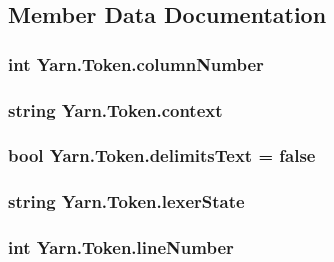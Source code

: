 \subsection{Member Data Documentation}
\hypertarget{a00149_a9a0f0a8a7ab1e90ab48f15192323ffca}{
\subsubsection[{column\-Number}]{\setlength{\rightskip}{0pt plus 5cm}int Yarn.\-Token.\-column\-Number}}\label{a00149_a9a0f0a8a7ab1e90ab48f15192323ffca}
\hypertarget{a00149_a089d248c904a6e8366b81c2c47ff5af8}{
\subsubsection[{context}]{\setlength{\rightskip}{0pt plus 5cm}string Yarn.\-Token.\-context}}\label{a00149_a089d248c904a6e8366b81c2c47ff5af8}
\hypertarget{a00149_af15d26fa4e6f276ab58ff66d3c4203da}{
\subsubsection[{delimits\-Text}]{\setlength{\rightskip}{0pt plus 5cm}bool Yarn.\-Token.\-delimits\-Text = false}}\label{a00149_af15d26fa4e6f276ab58ff66d3c4203da}
\hypertarget{a00149_a710099e7abe84f30864a320cc7464214}{
\subsubsection[{lexer\-State}]{\setlength{\rightskip}{0pt plus 5cm}string Yarn.\-Token.\-lexer\-State}}\label{a00149_a710099e7abe84f30864a320cc7464214}
\hypertarget{a00149_a80fe710713201bb793a41452e314a721}{
\subsubsection[{line\-Number}]{\setlength{\rightskip}{0pt plus 5cm}int Yarn.\-Token.\-line\-Number}}\label{a00149_a80fe710713201bb793a41452e314a721}
